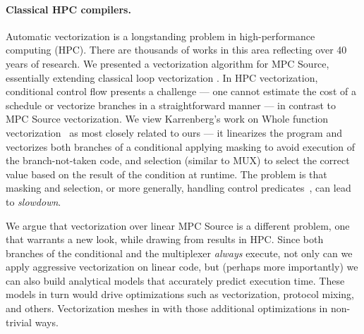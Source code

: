 \documentclass[sigconf, screen, natbib=false, dvipsnames, table]{acmart}
\theoremstyle{definition}
\begin{document}

\paragraph{Classical HPC compilers.}
Automatic vectorization is a longstanding problem in high-performance computing (HPC). 
There are thousands of works in this area reflecting over 40 years of research. We presented a vectorization
algorithm for MPC Source, essentially extending classical loop vectorization \cite{Allen:1987}. In HPC vectorization, conditional control flow 
presents a challenge --- one cannot estimate the cost of a schedule or vectorize branches in a straightforward manner --- in contrast to 
MPC Source vectorization. 
We view Karrenberg's work on Whole function vectorization~\cite{Karrenberg:2015} as most closely related to ours --- it linearizes the program and vectorizes 
both branches of a conditional applying masking to avoid execution of the branch-not-taken code, and selection (similar to MUX) to select the correct value based on the 
result of the condition at runtime. 
The problem is that masking and selection, or more generally, handling control predicates~\cite{Benabderrahmane:2010,Karrenberg:2015}, 
can lead to \emph{slowdown}. 

We argue that vectorization over linear MPC Source is a different problem, one that warrants a new look, while drawing from 
results in HPC.
Since both branches of the conditional and the multiplexer \emph{always} execute, not only can we apply aggressive vectorization on linear code, but (perhaps more importantly) 
we can also build analytical models that accurately predict execution time. These models in turn would drive optimizations such as vectorization, protocol mixing, and others. 
Vectorization meshes in with those additional optimizations in non-trivial ways.
\end{document}
